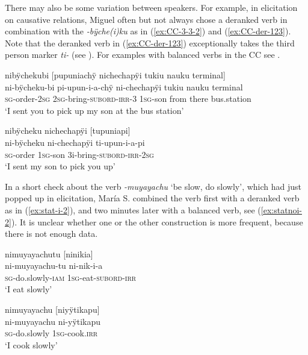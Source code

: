 There may also be some variation between speakers. For example, in elicitation on causative relations, Miguel often but not always chose a deranked verb in combination with the  \textit{-bÿche(i)ku}  as in (\ref{ex:CC-3-3-2}) and (\ref{ex:CC-der-123}). Note that the deranked verb in (\ref{ex:CC-der-123}) exceptionally takes the third person marker \textit{ti-} (see ). For examples with balanced verbs in the CC see .

\ea\label{ex:CC-3-3-2}
\begingl
\glpreamble nibÿchekubi \textup{[}pupuniachÿ nichechapÿi tukiu nauku terminal\textup{]}\\
\gla ni-bÿcheku-bi pi-upun-i-a-chÿ ni-chechapÿi tukiu nauku terminal\\
\textsc{sg}-order-2\textsc{sg} 2\textsc{sg}-bring-\textsc{subord}-\textsc{irr}-3 1\textsc{sg}-son from there bus.station\\
\glft ‘I sent you to pick up my son at the bus station’
\endgl
\trailingcitation{[mxx-e160811sd.301-302]}
\xe


\ea\label{ex:CC-der-123}
\begingl
\glpreamble nibÿcheku nichechapÿi \textup{[}tupuniapi\textup{]}\\
\gla ni-bÿcheku ni-chechapÿi ti-upun-i-a-pi\\
\textsc{sg}-order 1\textsc{sg}-son 3i-bring-\textsc{subord}-\textsc{irr}-2\textsc{sg}\\
\glft ‘I sent my son to pick you up’
\endgl
\trailingcitation{[mxx-e160811sd.307]}
\xe

In a short check about the verb \textit{-muyayachu} ‘be slow, do slowly’, which had just popped up in elicitation, María S. combined the verb first with a deranked verb as in (\ref{ex:stat-i-2}), and two minutes later with a balanced verb, see (\ref{ex:statnoi-2}). It is unclear whether one or the other construction is more frequent, because there is not enough data.

\ea\label{ex:stat-i-2}
\begingl
\glpreamble nimuyayachutu \textup{[}ninikia\textup{]}\\
\gla ni-muyayachu-tu ni-nik-i-a\\
\textsc{sg}-do.slowly-\textsc{iam} 1\textsc{sg}-eat-\textsc{subord}-\textsc{irr}\\
\glft ‘I eat slowly’
\endgl
\trailingcitation{[rmx-e150922l.086]}
\xe

\ea\label{ex:statnoi-2}
\begingl
\glpreamble nimuyayachu \textup{[}niyÿtikapu\textup{]}\\
\gla ni-muyayachu ni-yÿtikapu\\
\textsc{sg}-do.slowly 1\textsc{sg}-cook.\textsc{irr}\\
\glft ‘I cook slowly’
\endgl
\trailingcitation{[rmx-e150922l.091]}
\xe

